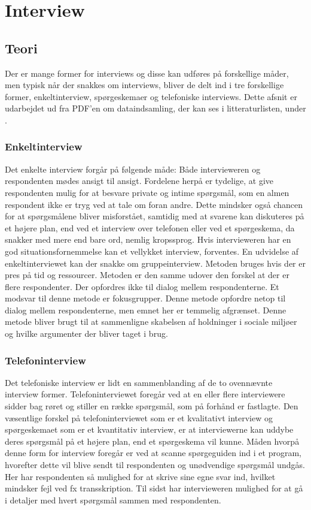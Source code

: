 \chapter{Interview}
\section{Teori}
Der er mange former for interviews og disse kan udføres på forskellige måder, men typisk når der snakkes om interviews, bliver de delt ind i tre forskellige former, enkeltinterview, spørgeskemaer og telefoniske interviews.
Dette afsnit er udarbejdet ud fra PDF'en om dataindsamling, der kan ses i litteraturlisten, under \citep{metodeogprojektskrivning}.\newline

\subsection{Enkeltinterview}
Det enkelte interview forgår på følgende måde: Både intervieweren og respondenten mødes ansigt til ansigt. Fordelene herpå er tydelige, at give respondenten mulig for at besvare private og intime spørgsmål, som en almen respondent ikke er tryg ved at tale om foran andre. Dette mindsker også chancen for at spørgsmålene bliver misforstået, samtidig med at svarene kan diskuteres på et højere plan, end ved et interview over telefonen eller ved et spørgeskema, da snakker med mere end bare ord, nemlig kropssprog. Hvis intervieweren har en god situationsfornemmelse kan et vellykket interview, forventes. 
En udvidelse af enkeltinterviewet kan der snakke om gruppeinterview. Metoden bruges hvis der er pres på tid og ressourcer. Metoden er den samme udover den forskel at der er flere respondenter. Der opfordres ikke til dialog mellem respondenterne. Et modsvar til denne metode er fokusgrupper. Denne metode opfordre netop til dialog mellem respondenterne, men emnet her er temmelig afgrænset. Denne metode bliver brugt til at sammenligne skabelsen af holdninger i sociale miljøer og hvilke argumenter der bliver taget i brug. \newline

\subsection{Telefoninterview}
Det telefoniske interview er lidt en sammenblanding af de to ovennævnte interview former. Telefoninterviewet foregår ved at en eller flere interviewere sidder bag røret og stiller en række spørgsmål, som på forhånd er fastlagte. Den væsentlige forskel på telefoninterviewet som er et kvalitativt interview og spørgeskemaet som er et kvantitativ interview, er at interviewerne kan uddybe deres spørgsmål på et højere plan, end et spørgeskema vil kunne. Måden hvorpå denne form for interview foregår er ved at scanne spørgeguiden ind i et program, hvorefter dette vil blive sendt til respondenten og unødvendige spørgsmål undgås. Her har respondenten så mulighed for at skrive sine egne svar ind, hvilket mindsker fejl ved fx transskription. Til sidst har intervieweren mulighed for at gå i detaljer med hvert spørgsmål sammen med respondenten.\citep{Projektskrivning}\newline

